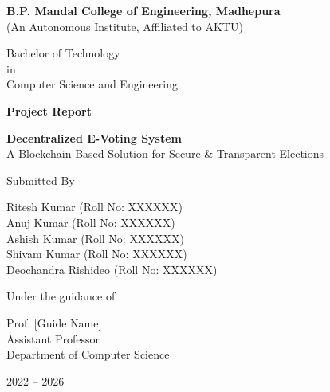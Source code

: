 \documentclass[12pt,a4paper]{report}
\begin{document}
\begin{titlepage}
\centering

{\Large \textbf{B.P. Mandal College of Engineering, Madhepura}}\\
\vspace{0.3cm}
{\large (An Autonomous Institute, Affiliated to AKTU)}\\
\vspace{0.5cm}

Bachelor of Technology\\
in\\
Computer Science and Engineering

\vspace{1cm}

{\Huge \textbf{Project Report}}

\vspace{0.5cm}

{\LARGE \textbf{Decentralized E-Voting System}}\\[0.3cm]
{\large A Blockchain-Based Solution for Secure \& Transparent Elections}

\vspace{1cm}

Submitted By

\vspace{0.3cm}
\begin{center}
Ritesh Kumar (Roll No: XXXXXX)\\
Anuj Kumar   (Roll No: XXXXXX)\\
Ashish Kumar (Roll No: XXXXXX)\\
Shivam Kumar (Roll No: XXXXXX)\\
Deochandra Rishideo (Roll No: XXXXXX)
\end{center}

\vspace{1cm}

Under the guidance of

\vspace{0.2cm}
Prof. [Guide Name]\\
Assistant Professor\\
Department of Computer Science

\vfill

2022 -- 2026

\end{titlepage}

\end{document}
